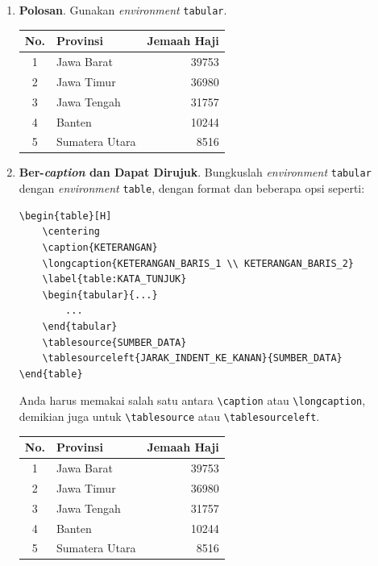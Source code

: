\begin{enumerate}[label=\alph*.]
    \item \textbf{Polosan}. Gunakan \textit{environment} \texttt{tabular}.
    \begin{center}
        \begin{tabular}{c l r}
            \hline
            No. & Provinsi & Jemaah Haji \\
            \hline
            1 & Jawa Barat & 39753 \\
            2 & Jawa Timur & 36980 \\
            3 & Jawa Tengah & 31757 \\
            4 & Banten & 10244 \\
            5 & Sumatera Utara & 8516 \\
            \hline
        \end{tabular}
    \end{center}
    
    \item \textbf{Ber-\textit{caption} dan Dapat Dirujuk}. Bungkuslah \textit{environment} \texttt{tabular} dengan \textit{environment} \texttt{table}, dengan format dan beberapa opsi seperti:
    \begin{lstlisting}[]
\begin{table}[H]
    \centering
    \caption{KETERANGAN}
    \longcaption{KETERANGAN_BARIS_1 \\ KETERANGAN_BARIS_2}
    \label{table:KATA_TUNJUK}
    \begin{tabular}{...}
        ...
    \end{tabular}
    \tablesource{SUMBER_DATA}
    \tablesourceleft{JARAK_INDENT_KE_KANAN}{SUMBER_DATA}
\end{table}
    \end{lstlisting}
    
    Anda harus memakai salah satu antara \verb|\caption| atau \verb|\longcaption|, demikian juga untuk \verb|\tablesource| atau \verb|\tablesourceleft|.
    
    \begin{table}[H]
        \centering
        \label{table:5-provinsi-jemaah-haji}
        \begin{tabular}{c l r}
            \hline
            No. & Provinsi & Jemaah Haji \\
            \hline
            1 & Jawa Barat & 39753 \\
            2 & Jawa Timur & 36980 \\
            3 & Jawa Tengah & 31757 \\
            4 & Banten & 10244 \\
            5 & Sumatera Utara & 8516 \\
            \hline
        \end{tabular}
    \end{table}
    

\end{enumerate}
